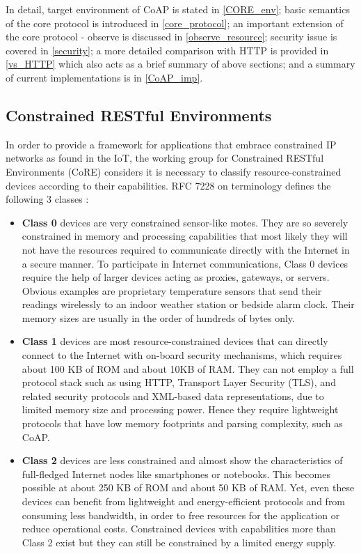 In detail, target environment of CoAP is stated in \autoref{CORE_env}; basic semantics of the core protocol is introduced in \autoref{core_protocol}; an important extension of the core protocol - observe is discussed in \autoref{observe_resource}; security issue is covered in \autoref{security}; a more detailed comparison with HTTP is provided in \autoref{vs_HTTP} which also acts as a brief summary of above sections; and a summary of current implementations is in \autoref{CoAP_imp}.

\subsection{Constrained RESTful Environments}\label{CORE_env}

In order to provide a framework for applications that embrace constrained IP networks as found in the IoT,  the working group for Constrained RESTful Environments (CoRE) considers it is necessary to classify resource-constrained devices according to their capabilities. RFC 7228 on terminology defines the following 3 classes \cite{constarined_env}\cite{kovatsch2015scalable}:

\begin{itemize}

\item \textbf{Class 0} devices are very constrained sensor-like motes.  They are so severely constrained in memory and processing capabilities that most likely they will not have the resources required to communicate directly with the Internet in a secure manner.  To participate in Internet communications, Class 0 devices require the help of larger devices acting as proxies, gateways, or servers. Obvious examples are proprietary temperature sensors that send their readings wirelessly to an indoor weather station or bedside alarm clock. Their memory sizes are usually in the order of hundreds of bytes only.

\item \textbf{Class 1} devices are most resource-constrained devices that can directly connect to the Internet with on-board security mechanisms, which requires about 100 KB of ROM and about 10KB of RAM.  They can not employ a full protocol stack such as using HTTP, Transport Layer Security (TLS), and related security protocols and XML-based data representations, due to limited memory size and processing power. Hence they require lightweight protocols that have low memory footprints and parsing complexity, such as CoAP.

\item \textbf{Class 2} devices are less constrained and almost show the characteristics of full-fledged Internet nodes like smartphones or notebooks. This becomes possible at about 250 KB of ROM and about 50 KB of RAM. Yet, even these devices can benefit from lightweight and energy-efficient protocols and from consuming less bandwidth, in order to free resources for the application or reduce operational costs. Constrained devices with capabilities more than Class 2 exist but they can still be constrained by a limited energy supply.

\end{itemize}

